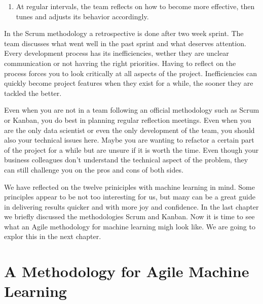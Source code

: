 \documentclass[]{book}
\providecommand{\tightlist}{%
  \setlength{\itemsep}{0pt}\setlength{\parskip}{0pt}}
\begin{document}
\begin{enumerate}
\def\labelenumi{\arabic{enumi})}
\setcounter{enumi}{11}
\tightlist
\item
  At regular intervals, the team reflects on how to become more effective, then tunes and adjusts its behavior accordingly.
\end{enumerate}

In the Scrum methodology a retrospective is done after two week sprint. The team discusses what went well in the past sprint and what deserves attention. Every development process has its inefficiencies, wether they are unclear communication or not havring the right priorities. Having to reflect on the process forces you to look critically at all aspects of the project. Inefficiencies can quickly become project features when they exist for a while, the sooner they are tackled the better.

Even when you are not in a team following an official methodology such as Scrum or Kanban, you do best in planning regular reflection meetings. Even when you are the only data scientist or even the only development of the team, you should also your technical issues here. Maybe you are wanting to refactor a certain part of the project for a while but are unsure if it is worth the time. Even though your business colleagues don't understand the technical aspect of the problem, they can still challenge you on the pros and cons of both sides.

We have reflected on the twelve priniciples with machine learning in mind. Some principles appear to be not too interesting for us, but many can be a great guide in delivering results quicker and with more joy and confidence. In the last chapter we briefly discussed the methodologies Scrum and Kanban. Now it is time to see what an Agile methodology for machine learning migh look like. We are going to explor this in the next chapter.

\hypertarget{a-methodology-for-agile-machine-learning}{%
\chapter{A Methodology for Agile Machine Learning}\label{a-methodology-for-agile-machine-learning}}


\end{document}
